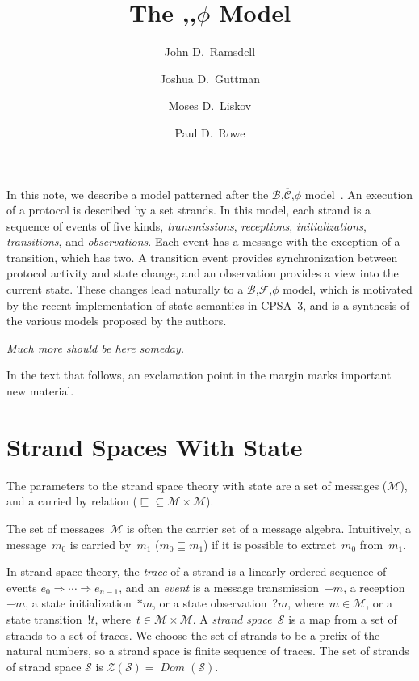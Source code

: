 \documentclass[12pt]{article}
\title{The \bun,\family,$\phi$ Model}
\author{John D.~Ramsdell\and Joshua D.~Guttman\and Moses D.~Liskov\and
  Paul D.~Rowe}
\newcommand{\fn}[1]{\ensuremath{\operatorname{\mathit{#1}}}}
\newcommand{\inbnd}{\mathord -}
\newcommand{\outbnd}{\mathord +}
\newcommand{\start}{\mathord\ast}
\newcommand{\sync}{\mathord !}
\newcommand{\obsv}{\mathord ?}
\newcommand{\msg}{\ensuremath{\mathcal{M}}}
\newcommand{\ssp}{\ensuremath{\mathcal{S}}}
\newcommand{\bun}{\ensuremath{\mathcal{B}}}
\newcommand{\strands}{\ensuremath{\mathcal{Z}}}
\newcommand{\dom}{\fn{Dom}}
\newcommand{\comp}{\ensuremath{\mathcal{C}}}
\newcommand{\family}{\ensuremath{\mathcal{F}}}
\newcommand{\cbar}[1]{\ensuremath{\overline{#1}}}
\begin{document}
\maketitle

In this note, we describe a model patterned after the
\bun,\cbar\comp,$\phi$ model~\cite{Guttman12}.  An execution of a protocol
is described by a set strands.  In this model, each strand is a
sequence of events of five kinds, \emph{transmissions},
\emph{receptions}, \emph{initializations}, \emph{transitions}, and
\emph{observations}.  Each event has a message with the exception of a
transition, which has two.  A transition event provides
synchronization between protocol activity and state change, and an
observation provides a view into the current state.  These changes
lead naturally to a \bun,\family,$\phi$ model, which is motivated by the
recent implementation of state semantics in CPSA~3, and is a synthesis
of the various models proposed by the authors.

\emph{Much more should be here someday.}

In the text that follows, an exclamation point in the margin marks
important new material.

\section{Strand Spaces With State}\label{sec:strand spaces}

The parameters to the strand space theory with state are a set
of messages (\msg), and a carried by relation
(${\sqsubseteq}\subseteq\msg\times\msg$).

The set of messages~{\msg} is often the carrier set of a message
algebra.  Intuitively, a message~$m_0$ is carried by~$m_1$
($m_0\sqsubseteq m_1$) if it is possible to extract~$m_0$ from~$m_1$.

In strand space theory, the \emph{trace} of a strand is a linearly
ordered sequence of events $e_0\Rightarrow\cdots\Rightarrow e_{n-1}$,
and an \emph{event} is a message transmission~$\outbnd m$, a
reception~$\inbnd m$, a state initialization~$\start m$, or a state
observation~$\obsv m$, where~$m\in\msg$, or a
\marginpar{!}
state transition~$\sync t$, where~$t\in\msg\times\msg$.  A
\emph{strand space}~$\ssp$ is a map from a set of strands to a set of
traces.  We choose the set of strands to be a prefix of the natural
numbers, so a strand space is finite sequence of traces.  The set of
strands of strand space {\ssp} is $\strands(\ssp)=\dom(\ssp)$.
\end{document}
